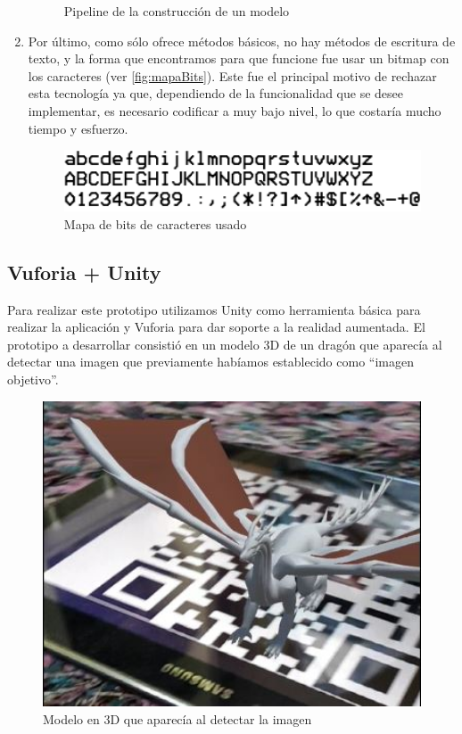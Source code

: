 \begin{enumerate}
\begin{figure}
        \caption{Pipeline de la construcción de un modelo\cite{pipelineopengl}}
        \label{fig:pipeline}
    \end{figure}
    \item Por último, como sólo ofrece métodos básicos, no hay métodos de escritura de texto, y la forma que 
    encontramos para que funcione fue usar un bitmap con los caracteres (ver \autoref{fig:mapaBits}). Este fue el principal 
    motivo de rechazar esta tecnología ya que, dependiendo de la funcionalidad que se desee implementar, es necesario codificar a muy bajo nivel, lo que costaría mucho tiempo y esfuerzo.
    \begin{figure}
        \centering
        \includegraphics[width=5in]{figures/bitmap-font.png}
        \caption{Mapa de bits de caracteres usado}
        \label{fig:mapaBits}
    \end{figure}
\end{enumerate}

\subsection{Vuforia + Unity} 
\label{makereference4.1.4}

    Para realizar este prototipo utilizamos Unity como herramienta básica para realizar la aplicación y Vuforia para dar soporte a la realidad aumentada.
    El prototipo a desarrollar consistió en un modelo 3D de un dragón que aparecía al detectar una imagen que previamente habíamos establecido como ``imagen objetivo''.

    \begin{figure}[H]
        \centering
        \includegraphics[width=5in]{figures/prototipoUnity.jpg}
        \caption{Modelo en 3D que aparecía al detectar la imagen}
    \end{figure}

